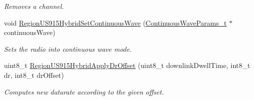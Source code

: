 \begin{DoxyCompactItemize}
\begin{DoxyCompactList}\small\item\em Removes a channel. \end{DoxyCompactList}\item 
void \hyperlink{group__REGIONUS915HYB_gad7b0e2c75aff473cd0c4287d4c6f24d1}{Region\+U\+S915\+Hybrid\+Set\+Continuous\+Wave} (\hyperlink{group__REGION_gaf39bb5ba06921139c6d17f88a8d518cd}{Continuous\+Wave\+Params\+\_\+t} $\ast$continuous\+Wave)
\begin{DoxyCompactList}\small\item\em Sets the radio into continuous wave mode. \end{DoxyCompactList}\item 
uint8\+\_\+t \hyperlink{group__REGIONUS915HYB_gaa90275764dd76f7122c3253d2eab2c2f}{Region\+U\+S915\+Hybrid\+Apply\+Dr\+Offset} (uint8\+\_\+t downlink\+Dwell\+Time, int8\+\_\+t dr, int8\+\_\+t dr\+Offset)
\begin{DoxyCompactList}\small\item\em Computes new datarate according to the given offset. \end{DoxyCompactList}\end{DoxyCompactItemize}
